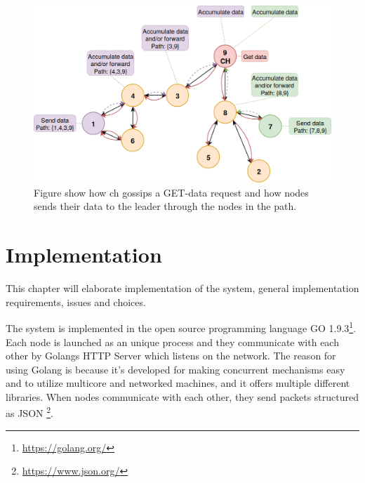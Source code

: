 \documentclass[USenglish]{uit-thesis}
\begin{document}

\begin{figure}
\centering
\includegraphics[width=\textwidth]{gatherSendData1.png}
\caption{Figure show how \gls{ch} gossips a GET-data request and how  nodes sends their data to the leader through the nodes in the path.}
\label{fig:gaterSendData}
\end{figure}



\chapter{Implementation} \label{chap:implementation}

This chapter will elaborate implementation of the system, general implementation requirements, issues and choices. 

The system is implemented in the open source programming language GO 1.9.3\footnote{\url{https://golang.org/}}. Each node is launched as an unique process and they communicate with each other by Golangs HTTP Server which listens on the  network. The reason for using Golang is because it's developed for making concurrent mechanisms easy and to utilize multicore and networked machines, and it offers multiple different libraries. When nodes communicate with each other, they send packets structured as JSON \footnote{\url{https://www.json.org/}}.
\end{document}
